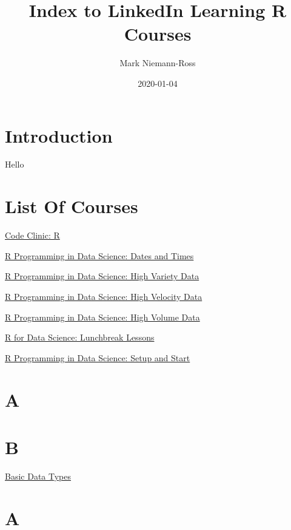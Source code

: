 \documentclass[]{book}
\title{Index to LinkedIn Learning R Courses}
\author{Mark Niemann-Ross}
\date{2020-01-04}
\begin{document}
\maketitle

{
\setcounter{tocdepth}{1}
\tableofcontents
}
\hypertarget{introduction}{%
\chapter*{Introduction}\label{introduction}}

Hello

\hypertarget{list-of-courses}{%
\chapter*{List Of Courses}\label{list-of-courses}}

\href{https://linkedin-learning.pxf.io/codeclinic_R}{Code Clinic: R}

\href{https://linkedin-learning.pxf.io/r_dates}{R Programming in Data Science: Dates and Times}

\href{https://linkedin-learning.pxf.io/r_highvariety}{R Programming in Data Science: High Variety Data}

\href{https://linkedin-learning.pxf.io/r_highvelocity}{R Programming in Data Science: High Velocity Data}

\href{https://linkedin-learning.pxf.io/r_highvolume}{R Programming in Data Science: High Volume Data}

\href{https://linkedin-learning.pxf.io/r_lunchbreak}{R for Data Science: Lunchbreak Lessons}

\href{https://linkedin-learning.pxf.io/setupstart}{R Programming in Data Science: Setup and Start}

\hypertarget{a}{%
\chapter*{A}\label{a}}

\hypertarget{b}{%
\chapter*{B}\label{b}}

\href{https://linkedin-learning.pxf.io/rweekly_atomics}{Basic Data Types}

\hypertarget{a-1}{%
\chapter*{A}\label{a-1}}
\end{document}
